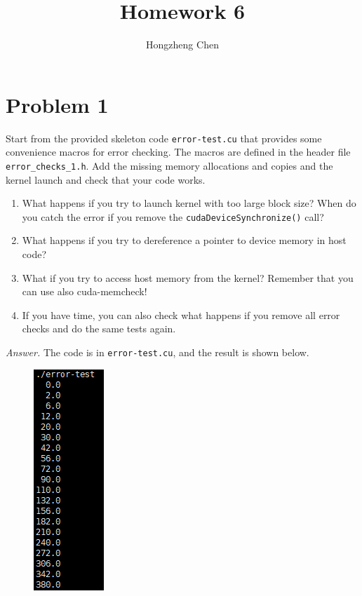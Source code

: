 \documentclass[english]{thesis}
\title{Homework 6}
\author{Hongzheng Chen}
\begin{document}
\maketitle

\section{Problem 1}
Start from the provided skeleton code \verb'error-test.cu' that provides some convenience macros for error checking.
The macros are defined in the header file \verb'error_checks_1.h'.
Add the missing memory allocations and copies and the kernel launch and check that your code works.
\begin{enumerate}
\item What happens if you try to launch kernel with too large block size?
When do you catch the error if you remove the \verb'cudaDeviceSynchronize()' call?
\item What happens if you try to dereference a pointer to device memory in host code?
\item What if you try to access host memory from the kernel?
Remember that you can use also cuda-memcheck!
\item If you have time, you can also check what happens if you remove all error checks and do the same tests again.
\end{enumerate}

\bigskip
\textit{Answer.} The code is in \verb'error-test.cu', and the result is shown below.
\begin{figure}[H]
\centering
\includegraphics[width=0.2\linewidth]{fig/res1.PNG}
\end{figure}
\end{document}
